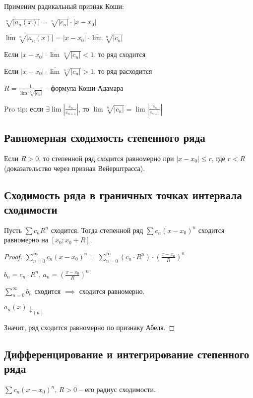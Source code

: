 Применим радикальный признак Коши:

$\sqrt[n]{|a_n(x)|} = \sqrt[n]{|c_n|} \cdot |x - x_0|$

$\overline{\lim}\sqrt[n]{|a_n(x)|} = |x - x_0| \cdot \overline{\lim}\sqrt[n]{|c_n|}$

Если $|x - x_0| \cdot \overline{\lim}\sqrt[n]{|c_n|} < 1$, то ряд сходится

Если $|x - x_0| \cdot \overline{\lim}\sqrt[n]{|c_n|} > 1$, то ряд расходится

$R = \frac{1}{\overline{\lim}\sqrt[n]{|c_n|}}$ -- формула Коши-Адамара

Pro tip: если $\exists \lim{\left|\frac{c_{n}}{c_{n+1}}\right|}$, то $\lim\sqrt[n]{|c_n|} = \lim\left|\frac{c_{n}}{c_{n+1}}\right|$

\subsection{Равномерная сходимость степенного ряда}

Если $R > 0$, то степенной ряд сходится равномерно при $|x - x_0| \leq r$, где $r < R$ (доказательство через признак Вейерштрасса).

\subsection{Сходимость ряда в граничных точках интервала сходимости}

Пусть $\sum c_n R^n$ сходится. Тогда степенной ряд $\sum c_n (x - x_0)^n$ сходится равномерно на $[x_0; x_0 + R]$.

\begin{proof}
$\sum_{n=0}^{\infty} c_n(x - x_0)^n$ =  $\sum_{n=0}^{\infty} (c_n \cdot R^n) \cdot \left(\frac{x - x_0}{R}\right)^n$

$b_n = c_n \cdot R^n$, $a_n = \left(\frac{x - x_0}{R}\right)^n$

$\sum_{n=0}^{\infty} b_n$ сходится $\implies$ сходится равномерно.

$a_n(x) \downarrow_{(n)}$

Значит, ряд сходится равномерно по признаку Абеля.
\end{proof}

\subsection{Дифференцирование и интегрирование степенного ряда}

$\sum c_n (x - x_0)^n$, $R > 0$ -- его радиус сходимости.

